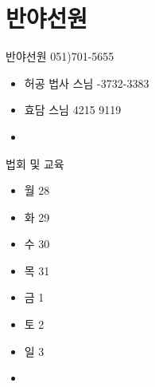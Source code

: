 \documentclass[aspectratio=1610,20pt,xcolor=pdftex,dvipsnames,table,handout]{beamer}
\begin{document}
		\section{반야선원}

		\begin{frame} [t,plain]

			\begin{block} {반야선원 051)701-5655 }
			\setlength{\leftmargini}{1em}			
			\begin{itemize}
				\item 허공 법사 스님 	-3732-3383
				\item 효담 스님		 4215 9119
				\item 
			\end{itemize}
			\end{block}						
		\end{frame}					

		\begin{frame} [t,plain]

			\begin{block} {법회 및 교육}				%
			\setlength{\leftmargini}{1em}			
			\begin{itemize}
				\item 월 28 \hrulefill 
				\item 화 29 \hrulefill 
				\item 수 30 \hrulefill 
				\item 목 31 \hrulefill 
				\item 금 1 \hrulefill 
				\item 토 2 \hrulefill 
				\item 일 3 \hrulefill 
				\item 
			\end{itemize}
			\end{block}						

		\end{frame}					


\end{document}
